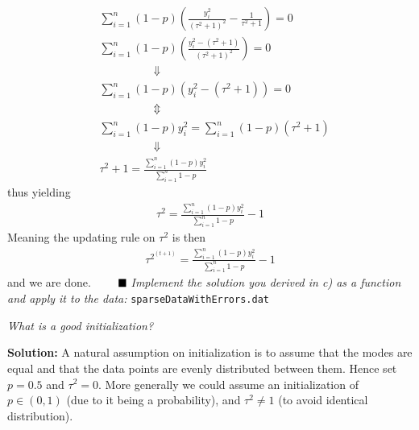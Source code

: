 \begin{align*}
    &\sum_{i=1}^{n} (1 - p) \left(\frac{y_{i}^2}{(\tau^2 +1)^2} - \frac{1}{\tau^2 + 1} \right) = 0 \\[5pt]
    &\sum_{i=1}^{n}  (1 - p) \left( \frac{y_{i}^2 - (\tau^2 + 1)}{(\tau^2 +1)^2}\right) =  0 \\[5pt]
     & \hspace{2cm} \Downarrow \\[5pt]
     &\sum_{i=1}^{n}  (1 - p) \left( y_{i}^2 - (\tau^2 + 1)\right) = 0 \\[5pt]
      & \hspace{2cm} \Updownarrow \\[5pt]
      &\sum_{i=1}^{n}  (1 - p) y_{i}^2 =  \sum_{i=1}^{n}  (1 - p) (\tau^2 + 1) \\[5pt]
      & \hspace{2cm} \Downarrow \\[5pt]
        &\tau^2 + 1 =  \frac{\sum_{i=1}^{n} (1 - p) y_{i}^2}{\sum_{i=1}^{n}1-p} 
\end{align*}
thus yielding 
\begin{align*}
    \tau^2 = \frac{\sum_{i=1}^{n} (1 - p) y_{i}^2}{\sum_{i=1}^{n}1-p}  - 1
\end{align*} 
Meaning the updating rule on $\tau^2$ is then 
\begin{align}
\tau^{{2}^{(t+1)}} = \frac{\sum_{i=1}^{n} (1 - p) y_{i}^2}{\sum_{i=1}^{n} 1-p}  - 1
\end{align}
and we are done. $\Q$
\emph{ Implement the solution you derived in c) as a function and apply it to the data:} \texttt{sparseDataWithErrors.dat}

\emph{What is a good initialization?} \spaze

\textbf{Solution:} \spaze
A natural assumption on initialization is to assume that the modes are equal and that the data points are evenly distributed between them. Hence set $p = 0.5$ and $\tau^2 = 0$. More generally we could assume an initialization of $p \in (0,1)$ (due to it being a probability), and $\tau^2 \neq 1$ (to avoid identical distribution). \\

